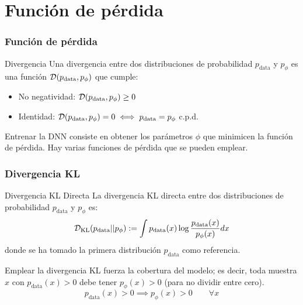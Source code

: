 \documentclass{beamer}
\begin{document}
\section{Función de pérdida}

\begin{frame}
	\frametitle{Función de pérdida}
	
	\begin{definitionblock}{Divergencia}
		Una divergencia entre dos distribuciones de probabilidad $p_{\text{data}}$ y $p_{\phi}$ es una función $\mathcal{D}(p_{\text{data}}, p_{\phi})$ que cumple:
		\begin{itemize}
			\item No negatividad: $\mathcal{D}(p_{\text{data}}, p_{\phi}) \geq 0$
			\item Identidad: $\mathcal{D}(p_{\text{data}}, p_{\phi}) = 0 \iff p_{\text{data}} = p_{\phi}$ c.p.d.
		\end{itemize}
	\end{definitionblock}
	\pause

	Entrenar la DNN consiste en obtener los parámetros $\phi$ que minimicen la función de pérdida. Hay varias funciones de pérdida que se pueden emplear.
\end{frame}

\begin{frame}
	\frametitle{Divergencia KL}
	\begin{definitionblock}{Divergencia KL Directa}
		La divergencia KL directa entre dos distribuciones de probabilidad $p_{\text{data}}$ y $p_{\phi}$ es:
		\begin{equation*}
			\mathcal{D}_{\text{KL}}(p_{\text{data}} || p_{\phi}) := \int p_{\text{data}}(x) \log \frac{p_{\text{data}}(x)}{p_{\phi}(x)} dx
		\end{equation*}
		donde se ha tomado la primera distribución $p_{\text{data}}$ como referencia.
	\end{definitionblock}
	\pause

	Emplear la divergencia KL fuerza la \alert{cobertura del modelo}; es decir, toda muestra $x$ con $p_{\text{data}}(x) > 0$ debe tener $p_{\phi}(x) > 0$ (para no dividir entre cero).
	\begin{equation*}
		p_{\text{data}}(x) > 0 \implies p_{\phi}(x) > 0\qquad \forall x
	\end{equation*}
\end{frame}
\end{document}
